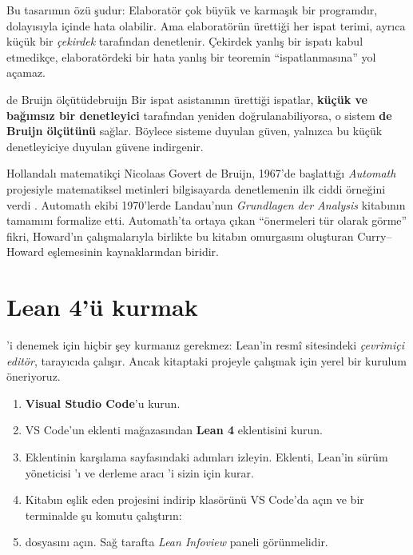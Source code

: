 Bu tasarımın özü şudur: Elaboratör çok büyük ve karmaşık bir programdır,
dolayısıyla içinde hata olabilir. Ama elaboratörün ürettiği her ispat
terimi, ayrıca küçük bir \emph{çekirdek} tarafından denetlenir. Çekirdek
yanlış bir ispatı kabul etmedikçe, elaboratördeki bir hata yanlış bir
teoremin ``ispatlanmasına'' yol açamaz.

\begin{tanim}{de Bruijn ölçütü}{debruijn}
Bir ispat asistanının ürettiği ispatlar, \textbf{küçük ve bağımsız bir
denetleyici} tarafından yeniden doğrulanabiliyorsa, o sistem \textbf{de
Bruijn ölçütünü} sağlar. Böylece sisteme duyulan güven, yalnızca bu küçük
denetleyiciye duyulan güvene indirgenir.
\end{tanim}

\begin{tarihce}
Hollandalı matematikçi Nicolaas Govert de Bruijn, 1967'de başlattığı
\emph{Automath} projesiyle matematiksel metinleri bilgisayarda denetlemenin
ilk ciddi örneğini verdi \citep{debruijn1970}. Automath ekibi 1970'lerde
Landau'nun \emph{Grundlagen der Analysis} kitabının tamamını formalize etti.
Automath'ta ortaya çıkan ``önermeleri tür olarak görme'' fikri, Howard'ın
çalışmalarıyla birlikte bu kitabın omurgasını oluşturan Curry--Howard
eşlemesinin kaynaklarından biridir.
\end{tarihce}

\section{Lean 4'ü kurmak}\label{sec:kurulum}

\Lean{}'i denemek için hiçbir şey kurmanız gerekmez: Lean'in resmî sitesindeki
\emph{çevrimiçi editör}, tarayıcıda çalışır. Ancak kitaptaki projeyle
çalışmak için yerel bir kurulum öneriyoruz.

\begin{enumerate}[adimlar]
  \item \textbf{Visual Studio Code}'u kurun.
  \item VS Code'un eklenti mağazasından \textbf{Lean 4} eklentisini kurun.
  \item Eklentinin karşılama sayfasındaki adımları izleyin. Eklenti, Lean'in
        sürüm yöneticisi 'ı ve derleme aracı 'i sizin
        için kurar.
  \item Kitabın eşlik eden projesini indirip klasörünü VS Code'da açın ve
        bir terminalde şu komutu çalıştırın:
\begin{center}
\end{center}
  \item {} dosyasını açın. Sağ tarafta
        \emph{Lean Infoview} paneli görünmelidir.
\end{enumerate}

